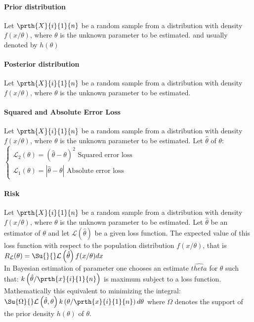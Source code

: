 \paragraph{Prior distribution}
Let $\prth{X}{i}{1}{n}$ be a random sample from a distribution with 
density $f(x/\theta)$, where $\theta$ is the unknown parameter to be
estimated.  and usually 
denoted by $h(\theta)$

\paragraph{Posterior distribution}
Let $\prth{X}{i}{1}{n}$ be a random sample from a distribution with
density $f(x/\theta)$, where $\theta$ is the unknown parameter to be
estimated. 

\paragraph{Squared and Absolute Error Loss}
Let $\prth{X}{i}{1}{n}$ be a random sample from a distribution with 
density $f(x/\theta)$, where $\theta$ is the unknown parameter to be
estimated. Let $\hat{\theta}$ of $\theta$:
$
\begin{cases}
	\mathcal{L}_{2}\left(\theta\right) = \left(\hat{\theta}-\theta\right)^{2}\text{ Squared error loss}\\
	\mathcal{L}_{1}\left(\theta\right) = \left|\hat{\theta}-\theta\right|\text{ Absolute error loss}
\end{cases}
$

\paragraph{Risk}
Let $\prth{X}{i}{1}{n}$ be a random sample from a distribution with 
density $f(x/\theta)$, where $\theta$ is the unknown parameter to be
estimated. Let $\hat{\theta}$ be an estimator of $\theta$ and let 
$\mathcal{L}\left(\hat{\theta}\right)$ be a given loss function. The 
expected value of this loss function with respect to the population 
distribution $f(x/\theta)$, that is
$R_{\mathcal{L}}(\theta)=\Su{}{}\mathcal{L}\left(\hat{\theta}\right)f(x/\theta)dx$\\
In Bayesian estimation of parameter one chooses an estimate 
$\hat{theta}$ for $\theta$ such that:
$k\left(\hat{\theta}/\prth{x}{i}{1}{n}\right)$ is maximum subject to a
loss function.\\
Mathematically this equivalent to minimizing the integral:
$\Su{\Omega}{}\mathcal{L}\left(\hat{\theta},\theta\right)k\left(\theta/\prth{x}{i}{1}{n}\right)d\theta$
where $\Omega$ denotes the support of the prior density $h(\theta)$ of
$\theta$.


